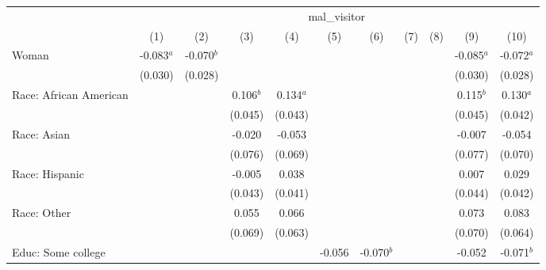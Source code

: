 
\begingroup
\centering
\begin{tabular}{lcccccccccc}
   \toprule
    & \multicolumn{10}{c}{mal\_visitor}\\
                             & (1)          & (2)          & (3)         & (4)         & (5)          & (6)          & (7)         & (8)         & (9)          & (10)\\  
   \midrule 
   Woman                     & -0.083$^{a}$ & -0.070$^{b}$ &             &             &              &              &             &             & -0.085$^{a}$ & -0.072$^{a}$\\   
                             & (0.030)      & (0.028)      &             &             &              &              &             &             & (0.030)      & (0.028)\\   
   Race: African American    &              &              & 0.106$^{b}$ & 0.134$^{a}$ &              &              &             &             & 0.115$^{b}$  & 0.130$^{a}$\\   
                             &              &              & (0.045)     & (0.043)     &              &              &             &             & (0.045)      & (0.042)\\   
   Race: Asian               &              &              & -0.020      & -0.053      &              &              &             &             & -0.007       & -0.054\\   
                             &              &              & (0.076)     & (0.069)     &              &              &             &             & (0.077)      & (0.070)\\   
   Race: Hispanic            &              &              & -0.005      & 0.038       &              &              &             &             & 0.007        & 0.029\\   
                             &              &              & (0.043)     & (0.041)     &              &              &             &             & (0.044)      & (0.042)\\   
   Race: Other               &              &              & 0.055       & 0.066       &              &              &             &             & 0.073        & 0.083\\   
                             &              &              & (0.069)     & (0.063)     &              &              &             &             & (0.070)      & (0.064)\\   
   Educ: Some college        &              &              &             &             & -0.056       & -0.070$^{b}$ &             &             & -0.052       & -0.071$^{b}$\\   

\end{tabular}

